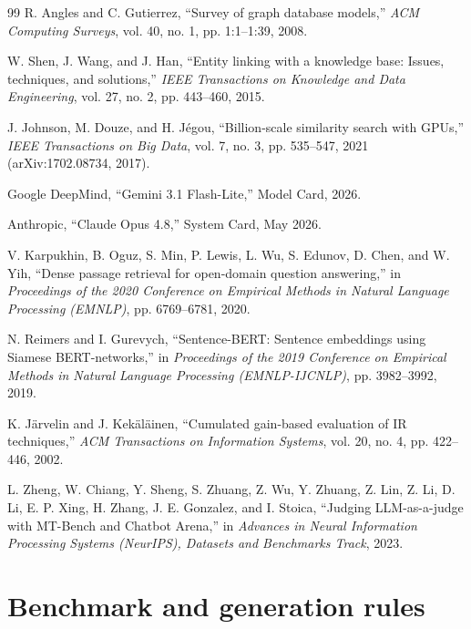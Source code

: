 \documentclass{article}
\begin{document}
\begin{thebibliography}{99}
 R. Angles and C. Gutierrez, ``Survey of graph database models,'' \emph{ACM Computing Surveys}, vol. 40, no. 1, pp. 1:1--1:39, 2008.

 W. Shen, J. Wang, and J. Han, ``Entity linking with a knowledge base: Issues, techniques, and solutions,'' \emph{IEEE Transactions on Knowledge and Data Engineering}, vol. 27, no. 2, pp. 443--460, 2015.

 J. Johnson, M. Douze, and H. J\'egou, ``Billion-scale similarity search with GPUs,'' \emph{IEEE Transactions on Big Data}, vol. 7, no. 3, pp. 535--547, 2021 (arXiv:1702.08734, 2017).

 Google DeepMind, ``Gemini 3.1 Flash-Lite,'' Model Card, 2026.

 Anthropic, ``Claude Opus 4.8,'' System Card, May 2026.

 V. Karpukhin, B. Oguz, S. Min, P. Lewis, L. Wu, S. Edunov, D. Chen, and W. Yih, ``Dense passage retrieval for open-domain question answering,'' in \emph{Proceedings of the 2020 Conference on Empirical Methods in Natural Language Processing (EMNLP)}, pp. 6769--6781, 2020.

 N. Reimers and I. Gurevych, ``Sentence-BERT: Sentence embeddings using Siamese BERT-networks,'' in \emph{Proceedings of the 2019 Conference on Empirical Methods in Natural Language Processing (EMNLP-IJCNLP)}, pp. 3982--3992, 2019.

 K. J\"arvelin and J. Kek\"al\"ainen, ``Cumulated gain-based evaluation of IR techniques,'' \emph{ACM Transactions on Information Systems}, vol. 20, no. 4, pp. 422--446, 2002.

 L. Zheng, W. Chiang, Y. Sheng, S. Zhuang, Z. Wu, Y. Zhuang, Z. Lin, Z. Li, D. Li, E. P. Xing, H. Zhang, J. E. Gonzalez, and I. Stoica, ``Judging LLM-as-a-judge with MT-Bench and Chatbot Arena,'' in \emph{Advances in Neural Information Processing Systems (NeurIPS), Datasets and Benchmarks Track}, 2023.

\end{thebibliography}

\newpage
\appendix

\section{Benchmark and generation rules}
\label{app:benchmark}
\end{document}
